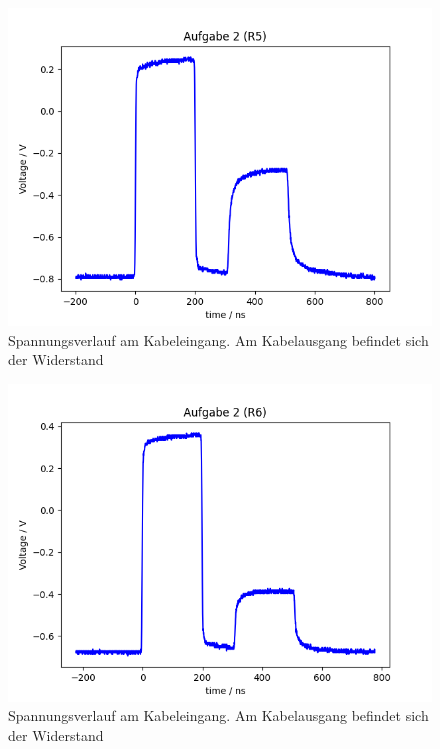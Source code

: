 \documentclass{article}
\begin{document}
\begin{figure}[H]
\centering
\caption{Spannungsverlauf am Kabeleingang. Am Kabelausgang befindet sich der Widerstand }
\label{fig:task2_R5}
\includegraphics[scale=0.6]{bilder/task2/task2_R5.png}
\end{figure}



\begin{figure}[H]
\centering
\caption{Spannungsverlauf am Kabeleingang. Am Kabelausgang befindet sich der Widerstand }
\label{fig:task2_R6}
\includegraphics[scale=0.6]{bilder/task2/task2_R6.png}
\end{figure}
\end{document}
